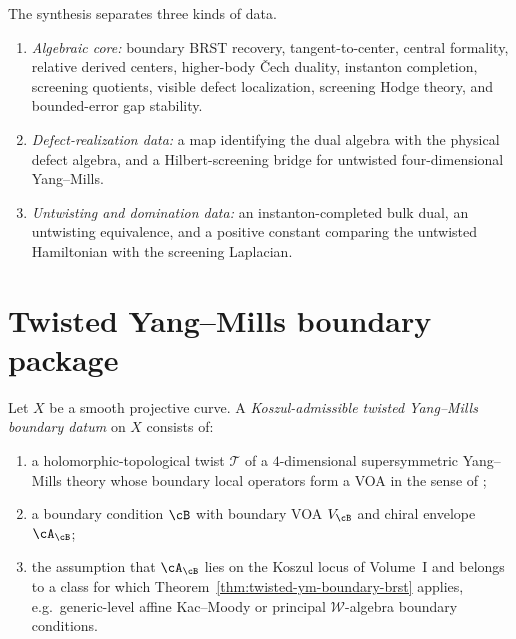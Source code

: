 \begin{remark}
\label{rem:ym-boundary-data-stratification}
The synthesis separates three kinds of data.
\begin{enumerate}[label=(\alph*)]
\item \emph{Algebraic core:} boundary BRST recovery, tangent-to-center, central formality,
relative derived centers, higher-body \v{C}ech duality, instanton completion, screening quotients,
visible defect localization, screening Hodge theory, and bounded-error gap stability.
\item \emph{Defect-realization data:} a map identifying the dual algebra with the physical defect algebra,
and a Hilbert-screening bridge for untwisted four-dimensional Yang--Mills.
\item \emph{Untwisting and domination data:} an instanton-completed bulk dual, an untwisting equivalence,
and a positive constant comparing the untwisted Hamiltonian with the screening Laplacian.
\end{enumerate}
\end{remark}


\section{Twisted Yang--Mills boundary package}
\label{sec:twisted-ym-boundary-package}

\begin{definition}
\label{def:twisted-ym-boundary-datum}
Let $X$ be a smooth projective curve. A \emph{Koszul-admissible twisted Yang--Mills boundary datum}
on $X$ consists of:
\begin{enumerate}[label=(\roman*)]
\item a holomorphic-topological twist $\mathcal{T}$ of a $4$-dimensional supersymmetric
Yang--Mills theory whose boundary local operators form a VOA in the sense of
{\cite{PW22}};
\item a boundary condition $\cB$ with boundary VOA $V_{\cB}$ and chiral envelope $\cA_{\cB}$;
\item the assumption that $\cA_{\cB}$ lies on the Koszul locus of Volume~I and belongs to a class
for which Theorem~\ref{thm:twisted-ym-boundary-brst} applies, e.g.\ generic-level affine
Kac--Moody or principal $\mathcal{W}$-algebra boundary conditions.
\end{enumerate}
\end{definition}

